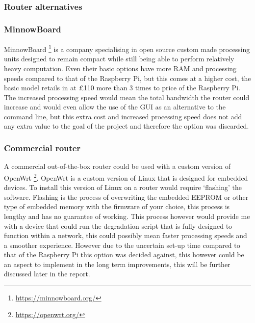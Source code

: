 \subsubsection{Router alternatives}

\subsubsection*{MinnowBoard}
MinnowBoard \footnote{\url{https://minnowboard.org/}} is a company specialising in open source custom made processing units designed to remain compact while still being able to perform relatively heavy computation. Even their basic options have more RAM and processing speeds compared to that of the Raspberry Pi, but this comes at a higher cost, the basic model retails in at £110 more than 3 times to price of the Raspberry Pi. The increased processing speed would mean the total bandwidth the router could increase and would even allow the use of the GUI as an alternative to the command line, but this extra cost and increased processing speed does not add any extra value to the goal of the project and therefore the option was discarded.

\subsubsection*{Commercial router}
A commercial out-of-the-box router could be used with a custom version of OpenWrt \footnote{\url{https://openwrt.org/}}. OpenWrt is a custom version of Linux that is designed for embedded devices. To install this version of Linux on a router would require `flashing' the software. Flashing is the process of overwriting the embedded EEPROM or other type of embedded memory with the firmware of your choice, this process is lengthy and has no guarantee of working. This process however would provide me with a device that could run the degradation script that is fully designed to function within a network, this could possibly mean faster processing speeds and a smoother experience. However due to the uncertain set-up time compared to that of the Raspberry Pi this option was decided against, this however could be an aspect to implement in the long term improvements, this will be further discussed later in the report.


